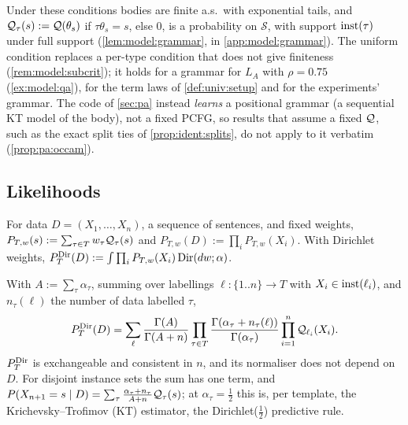 Under these conditions bodies are finite a.s.\ with exponential tails, and $\mathcal{Q}_\tau(s):=\mathcal{Q}(\theta_s)$ if $\tau\theta_s=s$, else $0$, is a probability on $\mathcal S$, with support $\mathrm{inst}(\tau)$ under full support (\cref{lem:model:grammar}, in \cref{app:model:grammar}). The uniform condition replaces a per-type condition that does not give finiteness (\cref{rem:model:subcrit}); it holds for a grammar for $L_A$ with $\rho=0.75$ (\cref{ex:model:qa}), for the term laws of \cref{def:univ:setup} and for the experiments' grammar. The code of \cref{sec:pa} instead \emph{learns} a positional grammar (a sequential KT model of the body), not a fixed PCFG, so results that assume a fixed $\mathcal{Q}$, such as the exact split ties of \cref{prop:ident:splits}, do not apply to it verbatim (\cref{prop:pa:occam}).

\subsection{Likelihoods}\label{sec:model:lik}

\begin{definition}\label{def:model:lzero}
For data $D=(X_1,\dots,X_n)$, a sequence of sentences, and fixed weights, $P_{T,w}(s):=\sum_{\tau\in T}w_\tau\mathcal{Q}_\tau(s)$ and $P_{T,w}(D):=\prod_iP_{T,w}(X_i)$. With Dirichlet weights, $P^{\mathrm{Dir}}_{T}(D):=\int\prod_iP_{T,w}(X_i)\,\mathrm{Dir}(dw;\alpha)$.
\end{definition}

\begin{lemma}\label{lem:model:dirsum}
With $A:=\sum_\tau\alpha_\tau$, summing over labellings $\ell:\{1..n\}\to T$ with $X_i\in\mathrm{inst}(\ell_i)$, and $n_\tau(\ell)$ the number of data labelled $\tau$,
\[
P^{\mathrm{Dir}}_{T}(D)=\sum_{\ell}\frac{\Gamma(A)}{\Gamma(A+n)}\prod_{\tau\in T}\frac{\Gamma(\alpha_\tau+n_\tau(\ell))}{\Gamma(\alpha_\tau)}\prod_{i=1}^n\mathcal{Q}_{\ell_i}(X_i).
\]
$P^{\mathrm{Dir}}_{T}$ is exchangeable and consistent in $n$, and its normaliser does not depend on $D$. For disjoint instance sets the sum has one term, and $P(X_{n+1}=s\mid D)=\sum_\tau\frac{\alpha_\tau+n_\tau}{A+n}\mathcal{Q}_\tau(s)$; at $\alpha_\tau=\tfrac12$ this is, per template, the Krichevsky--Trofimov (KT) estimator, the Dirichlet($\tfrac12$) predictive rule.
\end{lemma}

